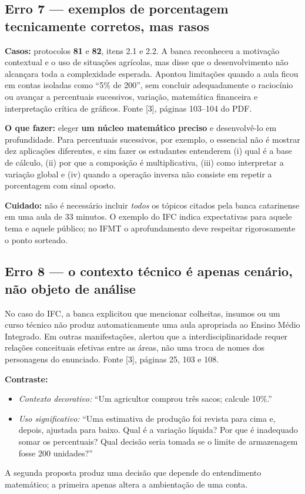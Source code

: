 \documentclass[11pt,a4paper]{article}
\begin{document}
\subsection{Erro 7 --- exemplos de porcentagem tecnicamente corretos, mas rasos}
\textbf{Casos:} protocolos \textbf{81} e \textbf{82}, itens 2.1 e 2.2. A banca reconheceu a motivação contextual e o uso de situações agrícolas, mas disse que o desenvolvimento não alcançara toda a complexidade esperada. Apontou limitações quando a aula ficou em contas isoladas como ``5\% de 200'', sem concluir adequadamente o raciocínio ou avançar a percentuais sucessivos, variação, matemática financeira e interpretação crítica de gráficos. Fonte [3], páginas 103--104 do PDF.

\textbf{O que fazer:} eleger \textbf{um núcleo matemático preciso} e desenvolvê-lo em profundidade. Para percentuais sucessivos, por exemplo, o essencial não é mostrar dez aplicações diferentes, e sim fazer os estudantes entenderem (i) qual é a base de cálculo, (ii) por que a composição é multiplicativa, (iii) como interpretar a variação global e (iv) quando a operação inversa não consiste em repetir a porcentagem com sinal oposto.

\textbf{Cuidado:} não é necessário incluir \textit{todos} os tópicos citados pela banca catarinense em uma aula de 33 minutos. O exemplo do IFC indica expectativas para aquele tema e aquele público; no IFMT o aprofundamento deve respeitar rigorosamente o ponto sorteado.

\subsection{Erro 8 --- o contexto técnico é apenas cenário, não objeto de análise}
No caso do IFC, a banca explicitou que mencionar colheitas, insumos ou um curso técnico não produz automaticamente uma aula apropriada ao Ensino Médio Integrado. Em outras manifestações, alertou que a interdisciplinaridade requer relações conceituais efetivas entre as áreas, não uma troca de nomes dos personagens do enunciado. Fonte [3], páginas 25, 103 e 108.

\textbf{Contraste:}
\begin{itemize}
\item \textit{Contexto decorativo:} ``Um agricultor comprou três sacos; calcule 10\%.''
\item \textit{Uso significativo:} ``Uma estimativa de produção foi revista para cima e, depois, ajustada para baixo. Qual é a variação líquida? Por que é inadequado somar os percentuais? Qual decisão seria tomada se o limite de armazenagem fosse 200 unidades?''
\end{itemize}
A segunda proposta produz uma decisão que depende do entendimento matemático; a primeira apenas altera a ambientação de uma conta.
\end{document}
